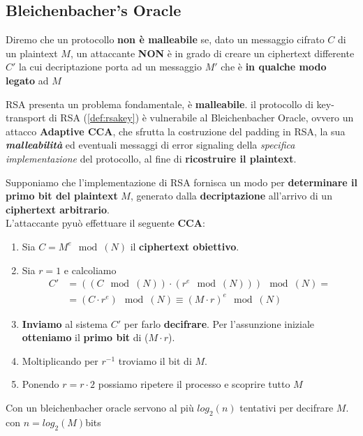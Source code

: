 \subsection{Bleichenbacher's Oracle}
\begin{definition}
Diremo che un protocollo \textbf{non è malleabile} se, dato un messaggio cifrato $C$ di un plaintext $M$, un attaccante \textbf{NON} è in grado di creare un ciphertext differente $C'$ la cui decriptazione porta ad un messaggio $M'$ che è \textbf{in qualche modo legato} ad $M$
\end{definition}
RSA presenta un problema fondamentale, è \textbf{malleabile}. 
il protocollo di key-transport di RSA (\cref{def:rsakey}) è vulnerabile al Bleichenbacher Oracle, ovvero un attacco \textbf{Adaptive CCA}, che sfrutta la costruzione del padding in RSA, la sua \textbf{\textit{malleabilità}} ed eventuali messaggi di error signaling della \textit{specifica implementazione} del protocollo, al fine di \textbf{ricostruire il plaintext}.
\begin{definition}\label{def:bleichenoracle}
Supponiamo che l'implementazione di RSA fornisca un modo per \textbf{determinare il primo bit del plaintext} $M$, generato dalla \textbf{decriptazione} all'arrivo di un \textbf{ciphertext arbitrario}\footnotemark.\\
L'attaccante pyuò effettuare il seguente \textbf{CCA}:
\begin{enumerate}
    \item Sia $C=M^e\mod(N)$ il \textbf{ciphertext obiettivo}.
    \item Sia $r=1$ e calcoliamo 
    \begin{equation*}
        \begin{aligned}
            C'&=((C\mod(N))\cdot(r^e\mod(N)))\mod(N)=\\
            &=(C\cdot r^e)\mod(N)\equiv(M\cdot r)^e\mod(N)
        \end{aligned}
    \end{equation*}
    \item \textbf{Inviamo} al sistema $C'$ per farlo \textbf{decifrare}. Per l'assunzione iniziale \textbf{otteniamo} il \textbf{primo bit} di ($M\cdot r$).\footnotemark
    \item Moltiplicando per $r^{-1}$ troviamo il bit di $M$. 
    \item Ponendo $r=r\cdot2$ possiamo ripetere il processo e scoprire tutto $M$
\end{enumerate}
\end{definition}
\begin{remark}
Con un bleichenbacher oracle servono al più $log_2(n)$ tentativi per decifrare $M$. con $n=log_2(M)$bits
\end{remark}
